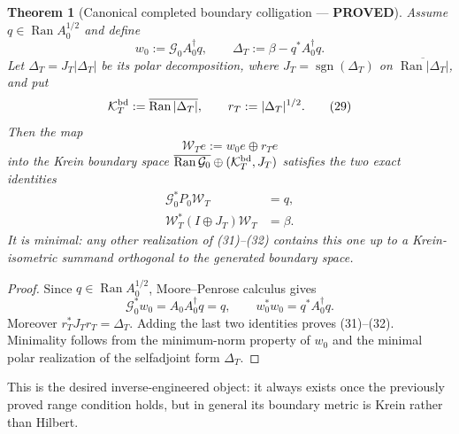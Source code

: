 \documentclass[11pt]{article}
\newtheorem{theorem}{Theorem}
\newcommand{\PROVED}{\textcolor{green!45!black}{\textbf{PROVED}}}
\newcommand{\Ran}{\operatorname{Ran}}
\begin{document}
\begin{theorem}[Canonical completed boundary colligation --- \PROVED]
Assume $q\in\Ran A_0^{1/2}$ and define
\begin{equation}
 w_0:=\mathcal G_0A_0^\dagger q,
 \qquad
 \Delta_T:=\beta-q^*A_0^\dagger q.                      \tag{28}
\end{equation}
Let $\Delta_T=J_T|\Delta_T|$ be its polar decomposition, where
$J_T=\operatorname{sgn}(\Delta_T)$ on
$\overline{\Ran|\Delta_T|}$, and put
\begin{equation}
 \mathcal K_T^{\rm bd}:=\overline{\Ran|\Delta_T|},
 \qquad r_T:=|\Delta_T|^{1/2}.                           \tag{29}
\end{equation}
Then the map
\begin{equation}
 \mathcal W_Te:=w_0e\oplus r_Te                         \tag{30}
\end{equation}
into the Krein boundary space
$\overline{\Ran\mathcal G_0}\oplus(\mathcal K_T^{\rm bd},J_T)$
satisfies the two exact identities
\begin{align}
 \mathcal G_0^*P_0\mathcal W_T&=q,                      \tag{31}\\
 \mathcal W_T^*(I\oplus J_T)\mathcal W_T&=\beta.        \tag{32}
\end{align}
It is minimal: any other realization of (31)--(32) contains this one up to a
Krein-isometric summand orthogonal to the generated boundary space.
\end{theorem}

\begin{proof}
Since $q\in\Ran A_0^{1/2}$, Moore--Penrose calculus gives
\[
 \mathcal G_0^*w_0
 =A_0A_0^\dagger q=q,
 \qquad
 w_0^*w_0=q^*A_0^\dagger q.
\]
Moreover $r_T^*J_Tr_T=\Delta_T$.  Adding the last two identities proves
(31)--(32).  Minimality follows from the minimum-norm property of $w_0$ and
the minimal polar realization of the selfadjoint form $\Delta_T$.
\end{proof}

This is the desired inverse-engineered object: it always exists once the
previously proved range condition holds, but in general its boundary metric is
Krein rather than Hilbert.
\end{document}
